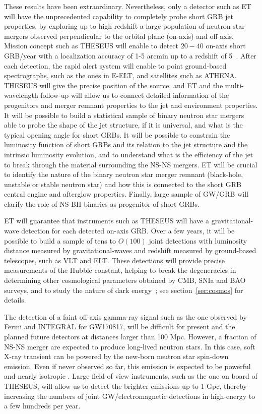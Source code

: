 These  results have been extraordinary. Nevertheless, only a detector such as ET will  have the unprecedented capability to completely probe short GRB jet properties, by exploring up to high redshift a large population of neutron star mergers observed perpendicular to the orbital plane (on-axis) and off-axis. Mission concept such as THESEUS will enable to detect $20-40$ on-axis short GRB/year with a localization accuracy of 1-5 arcmin up to a redshift of 5~\cite{Amati:2017npy,Stratta:2017bwq}.  After each detection, the rapid alert system will enable to point ground-based spectrographs, such as the ones in E-ELT, and satellites such as ATHENA. THESEUS will give the precise position of the source, and ET and the multi-wavelength follow-up will allow us to connect detailed information of the progenitors and merger remnant properties to the jet and environment properties. It will be possible to build a statistical sample of binary neutron star mergers  able to probe the shape of the jet structure, if it is universal, and what is the typical opening angle for short GRBs. It will be possible  to constrain the  luminosity function  of short GRBs and its relation to the jet structure and the intrinsic luminosity evolution, and to understand what is the efficiency of the jet to break through the material surrounding the NS-NS mergers. ET will be crucial to identify the nature of the binary neutron star merger remnant (black-hole, unstable or stable neutron star) and how this is connected to the short GRB central engine and afterglow properties. Finally, large sample of GW/GRB will clarify the role of NS-BH binaries as progenitor of short GRBs. 

ET will guarantee that instruments such as THESEUS will have a gravitational-wave detection for each detected on-axis GRB. Over a few years, it will be possible to build a sample of tens to $O(100)$  joint detections with luminosity distance measured by gravitational-waves and  redshift measured by ground-based telescopes, such as VLT and ELT. These detections will provide precise measurements of the Hubble constant, helping to break the degeneracies in determining other cosmological parameters obtained by CMB, SNIa and BAO surveys, and to study the nature of dark energy~\cite{Belgacem:2019tbw};  see section~\ref{sec:cosmos} for details.

The detection of a faint off-axis gamma-ray signal such as the one observed by Fermi and INTEGRAL for GW170817, will be difficult for present and the planned future detectors at distances larger than 100 Mpc. However, a fraction of NS-NS merger are expected to produce long-lived neutron stars. In this case, soft X-ray transient can be powered by the new-born neutron star spin-down emission. Even if never observed so far, this emission is expected to be powerful and nearly isotropic \cite{Metzger2014,Siegel2016}. Large field of view instruments, such as the one on board of THESEUS, will allow us to detect the brighter emissions up to 1 Gpc, thereby increasing the numbers of joint GW/electromagnetic detections in high-energy to a few hundreds per year. 


